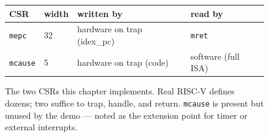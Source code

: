 \begin{figure}[htbp]
\centering
\begin{tabular}{llll}
\toprule
CSR & width & written by & read by \\
\midrule
\texttt{mepc}   & 32 & hardware on trap (idex\_pc) & \texttt{mret} \\
\texttt{mcause} & 5  & hardware on trap (code)    & software (full ISA) \\
\bottomrule
\end{tabular}
\caption{The two CSRs this chapter implements. Real RISC-V defines
dozens; two suffice to trap, handle, and return. \texttt{mcause} is
present but unused by the demo --- noted as the extension point for
timer or external interrupts.}
\label{fig:csr08}
\end{figure}
